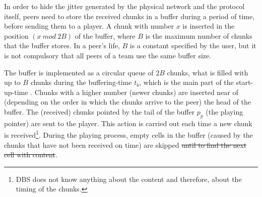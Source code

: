 

\label{sec:buffering_chunks}

In order to hide the jitter generated by the physical network and the
protocol itself, peers need to store the received chunks in a buffer
during a period of time, before sending them to a player. A chunk with
number $x$ is inserted in the position $(x~\mathit{mod}~2B)$ of the
buffer, where $B$ is the maximum number of chunks that the buffer
stores. In a peer's life, $B$ is a constant specified by the user,
but it is not compulsory that all peers of a team use the same buffer
size.

The buffer is implemented as a circular queue of $2B$ chunks, what is
filled with up to $B$ chunks during the \gls{buffering-time} $t_b$,
which is the main part of the \gls{start-up-time} . Chunks with a higher number (newer chunks) are inserted
near of (depending on the order in which the chunks arrive to the
peer) the head of the buffer. The (received) chunks pointed by the tail
of the buffer $p_p$ (the playing pointer) are sent to the player. This
action is carried out each time a new chunk is received\footnote{DBS
  does not know anything about the content and therefore, about the
  timing of the chunks.}. During the playing process, empty cells in
the buffer (caused by the chunks that have not been received on time)
are skipped \st{until to find the next cell with content}.

